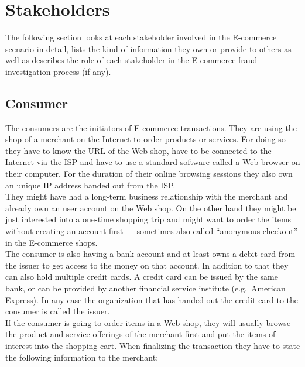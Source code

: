 
\section{Stakeholders}
\label{sec:stakeholder_analysis}

The following section looks at each stakeholder involved in the \gls{E-commerce} scenario in detail, lists the kind of information they own or provide to others as well as describes the role of each stakeholder in the \gls{E-commerce} fraud investigation process (if any).

\subsection{Consumer}
\label{subsec:stakeholder_consumer}

The consumers are the initiators of \gls{E-commerce} transactions. They are using the shop of a merchant on the Internet to order products or services. For doing so they have to know the \gls{URL} of the Web shop, have to be connected to the Internet via the \gls{ISP} and have to use a standard software called a Web browser on their computer. For the duration of their online browsing sessions they also own an unique \gls{IP} address handed out from the \gls{ISP}.\\

They might have had a long-term business relationship with the merchant and already own an user account on the Web shop. On the other hand they might be just interested into a one-time shopping trip and might want to order the items without creating an account first --- sometimes also called ``anonymous checkout'' in the \gls{E-commerce} shops. \\

The consumer is also having a bank account and at least owns a debit card from the issuer to get access to the money on that account. In addition to that they can also hold multiple credit cards. A credit card can be issued by the same bank, or can be provided by another financial service institute (e.g.\ American Express). In any case the organization that has handed out the credit card to the consumer is called the issuer. \\

If the consumer is going to order items in a Web shop, they will usually browse the product and service offerings of the merchant first and put the items of interest into the shopping cart. When finalizing the transaction they have to state the following information to the merchant:\@

